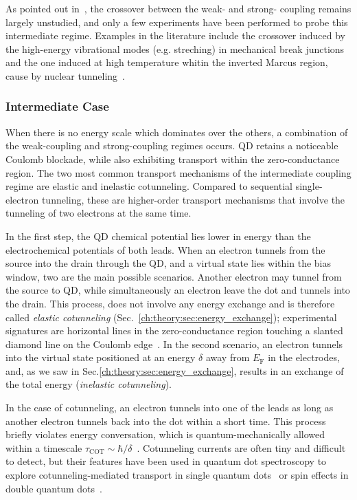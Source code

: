 As pointed out in~\cite{gehring2019single}, the crossover between the weak- and strong- coupling remains largely unstudied, and only a few experiments have been performed to probe this intermediate regime. Examples in the literature include the crossover induced by the high-energy vibrational modes (e.g. streching) in mechanical break junctions~\cite{frisenda2016transition} and the one induced at high temperature whitin the inverted Marcus region, cause by nuclear tunneling~\cite{sowa2018beyond}.

\subsubsection{Intermediate Case}\label{ch:theory:sec:intermediate_limit}
When there is no energy scale which dominates over the others, a combination of the weak-coupling and strong-coupling regimes occurs. \Gls{QD} retains a noticeable Coulomb blockade, while also exhibiting transport within the zero-conductance region. The two most common transport mechanisms of the intermediate coupling regime are elastic and inelastic cotunneling. Compared to sequential single-electron tunneling, these are higher-order transport mechanisms that involve the tunneling of two electrons at the same time.

In the first step, the \gls{QD} chemical potential lies lower in energy than the electrochemical potentials of both leads. When an electron tunnels from the source into the drain through the \gls{QD}, and a virtual state lies within the bias window, two are the main possible scenarios. Another electron may tunnel from the source to \gls{QD}, while simultaneously an electron leave the dot and tunnels into the drain. This process, does not involve any energy exchange and is therefore called \textit{elastic cotunneling} (Sec.~\ref{ch:theory:sec:energy_exchange}); experimental signatures are horizontal lines in the zero-conductance region touching a slanted diamond line on the Coulomb edge~\cite{gaudenzi2017transport}. In the second scenario, an electron tunnels into the virtual state positioned at an energy $\delta$ away from $E_\textrm{F}$ in the electrodes, and, as we saw in Sec.\ref{ch:theory:sec:energy_exchange}, results in an exchange of the total energy (\textit{inelastic cotunneling}).

In the case of cotunneling, an electron tunnels into one of the leads as long as another electron tunnels back into the dot within a short time. This process briefly violates energy conversation, which is quantum-mechanically allowed within a timescale $\tau_\textrm{COT}\sim\hbar/\delta$~\cite{averin1990virtual}. Cotunneling currents are often tiny and difficult to detect, but their features have been used in quantum dot spectroscopy to explore cotunneling-mediated transport in single quantum dots~\cite{schleser2005cotunneling} or spin effects in double quantum dots~\cite{liu2005pauli}.

